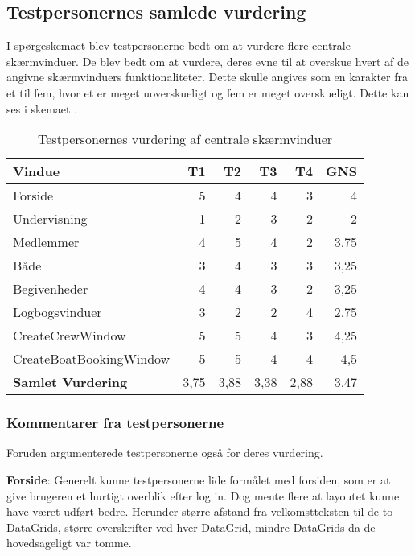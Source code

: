 \subsection{Testpersonernes samlede vurdering}

I spørgeskemaet blev testpersonerne bedt om at vurdere flere centrale skærmvinduer.
De blev bedt om at vurdere, deres evne til at overskue hvert af de angivne skærmvinduers funktionaliteter.
Dette skulle angives som en karakter fra et til fem, hvor et er meget uoverskueligt og fem er meget overskueligt.
Dette kan ses i skemaet .

\begin{table}[htbp]
    \centering
    \caption{Testpersonernes vurdering af centrale skærmvinduer}
    \begin{tabular}{l|rrrr|r}
        \toprule
        \textbf{Vindue} & T1 & T2 & T3 & T4 & \textbf{GNS} \\
        \midrule
        Forside & 5 & 4 & 4 & 3 & 4 \\
        Undervisning & 1 & 2 & 3 & 2 & 2 \\
        Medlemmer & 4 & 5 & 4 & 2 & 3,75 \\
        Både & 3 & 4 & 3 & 3 & 3,25 \\
        Begivenheder & 4 & 4 & 3 & 2 & 3,25 \\
        Logbogsvinduer & 3 & 2 & 2 & 4 & 2,75 \\
        CreateCrewWindow & 5 & 5 & 4 & 3 & 4,25 \\
        CreateBoatBookingWindow & 5 & 5 & 4 & 4 & 4,5 \\ \hline
        \textbf{Samlet Vurdering} & 3,75 & 3,88 & 3,38 & 2,88 & 3,47 \\
    \end{tabular}%
    \label{tab:vurderingtest}%
\end{table}%

\subsubsection*{Kommentarer fra testpersonerne}
Foruden  argumenterede testpersonerne også for deres vurdering.

\textbf{Forside}: 
Generelt kunne testpersonerne lide formålet med forsiden, som er at give brugeren et hurtigt overblik efter log in. 
Dog mente flere at layoutet kunne have været udført bedre.
Herunder større afstand fra velkomstteksten til de to DataGrids, større overskrifter ved hver DataGrid, mindre DataGrids da de hovedsageligt var tomme. 

